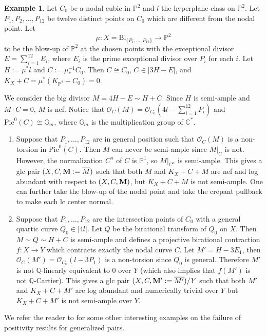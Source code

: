\documentclass[11pt]{amsart}
\numberwithin{equation}{section}
\newcommand{\Mm}{{\bf{M}}}
\newcommand{\Cc}{\mathbb{C}}
\newcommand{\Pp}{\mathbb{P}}
\newcommand{\Qq}{\mathbb{Q}}
\newcommand{\Oo}{\mathcal{O}}
\newcommand{\Pic}{\mathrm{Pic}}
\theoremstyle{definition}
\theoremstyle{definition}
\newtheorem{ex}[thm]{Example}
\theoremstyle{definition}
\begin{document}
\begin{ex}\label{ex: log abundant not semiample}
Let $C_0$ be a nodal cubic in $\Pp^2$ and $l$ the hyperplane class on $\Pp^2$. Let $P_1,P_2,...,P_{12}$ be twelve distinct points on $C_0$ which are different from the nodal point. Let
$$
\mu:X=\text{Bl}_{\{P_1,...,P_{12}\}}\to\Pp^2
$$
to be the blow-up of $\Pp^2$ at the chosen points with the exceptional divisor $E=\sum_{i=1}^{12}E_i$, where $E_i$ is the prime exceptional divisor over $P_i$ for each $i$. Let $H:=\mu^*l$ and $C:=\mu^{-1}_*C_0$. Then $C\cong C_0$, $C\in|3H-E|$, and $K_X+C=\mu^*(K_{\Pp^2}+C_0)=0$. 


We consider the big divisor $M=4H-E\sim H+C$. Since $H$ is semi-ample and $M\cdot C=0$, $M$ is nef. Notice that $\Oo_C(M)=\Oo_{C_0}(4l-\sum_{i=1}^{12}P_i)$ and $\Pic^0(C)\cong\mathbb G_m$, where $\mathbb G_m$ is the multiplication group of $\Cc^*$.

\begin{enumerate}
    \item Suppose that $P_1,...,P_{12}$ are in general position such that $\Oo_C(M)$ is a non-torsion in $\Pic^0(C)$. Then $M$ can never be semi-ample since $M|_C$ is not. However, the normalization $C^n$ of $C$ is $\Pp^1$, so $M|_{C^n}$ is semi-ample. This gives a glc pair $(X,C,\Mm:=\overline{M})$ such that both $M$ and $K_X+C+M$ are nef and log abundant with respect to $(X,C,\Mm)$, but $K_X+C+M$ is not semi-ample. One can further take the blow-up of the nodal point and take the crepant pullback to make each lc center normal.
    \item Suppose that $P_1,...,P_{12}$ are the intersection points of $C_0$ with a general quartic curve $Q_0\in|4l|$. Let $Q$ be the birational transform of $Q_0$ on $X$. Then $M\sim Q\sim H+C$ is semi-ample and defines a projective birational contraction $f: X\to Y$ which contracts exactly the nodal curve $C$. Let $M'=H-3E_1$, then $\Oo_C(M')=\Oo_{C_0}(l-3P_1)$ is a non-torsion since $Q_0$ is general. Therefore $M'$ is not $\Qq$-linearly equivalent to 0 over $Y$ (which also implies that $f(M')$ is not $\Qq$-Cartier). This gives a glc pair $(X,C,\Mm':=\overline{M'})/Y$ such that  both $M'$ and $K_X+C+M'$ are log abundant and numerically trivial over $Y$ but $K_X+C+M'$ is not semi-ample over $Y$.
\end{enumerate}
\end{ex}

We refer the reader to \cite{BH22} for some other interesting examples on the failure of positivity results for generalized pairs.
\end{document}
